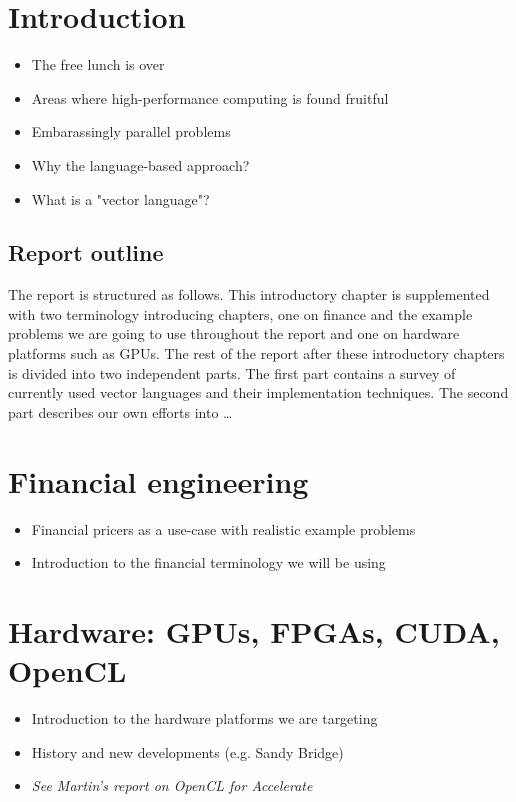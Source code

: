 \chapter{Introduction}
\begin{itemize}
\item The free lunch is over
\item Areas where high-performance computing is found fruitful
\item Embarassingly parallel problems
\item Why the language-based approach?
\item What is a "vector language"?
\end{itemize}

\section{Report outline}
The report is structured as follows. This introductory chapter is
supplemented with two terminology introducing chapters, one on finance
and the example problems we are going to use throughout the report and
one on hardware platforms such as GPUs. The rest of the report after
these introductory chapters is divided into two independent parts. The
first part contains a survey of currently used vector languages and
their implementation techniques. The second part describes our own
efforts into \ldots

\chapter{Financial engineering}
\begin{itemize}
\item Financial pricers as a use-case with realistic example problems
\item Introduction to the financial terminology we will be using
\end{itemize}

\chapter{Hardware: GPUs, FPGAs, CUDA, OpenCL}
\begin{itemize}
\item Introduction to the hardware platforms we are targeting
\item History and new developments (e.g. Sandy Bridge)
\item \textit{See Martin's report on OpenCL for Accelerate}
\end{itemize}


